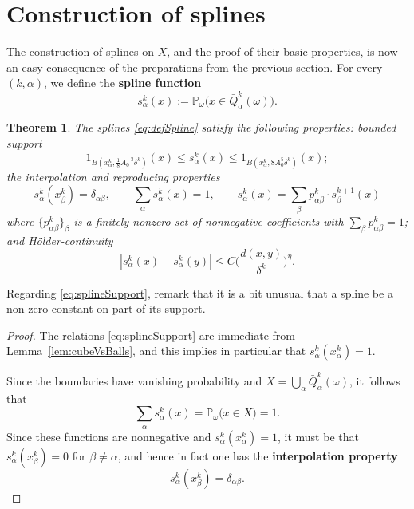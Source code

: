 \documentclass{amsart}
\numberwithin{equation}{section}
\theoremstyle{plain}
\newtheorem{theorem}[equation]{Theorem}
\theoremstyle{definition}
\theoremstyle{remark}
\begin{document}
{{\section{Construction of splines}

The construction of splines on $X$, and the proof of their basic properties, is now an easy consequence of the preparations from the previous section.
For every $(k,\alpha)$, we define the \textbf{spline function}
\begin{equation}\label{eq:defSpline}
  s^k_{\alpha}(x):={\mathbb{P}}_{\omega}\Big(x\in\bar{Q}^k_{\alpha}(\omega)\Big).
\end{equation}

\begin{theorem}
The splines \eqref{eq:defSpline} satisfy the following properties: bounded support
\begin{equation}\label{eq:splineSupport}
  1_{B(x^k_{\alpha},\tfrac{1}{8}A_0^{-3}\delta^k)}(x)\leq s^k_{\alpha}(x)\leq 1_{B(x^k_{\alpha},8A_0^5\delta^k)}(x);
\end{equation}
the interpolation and reproducing properties
\begin{equation}\label{eq:splineSum}
  s^k_\alpha(x^k_\beta)=\delta_{\alpha\beta},\qquad
  \sum_{\alpha}s^k_{\alpha}(x)=1,\qquad
  s^k_{\alpha}(x)
  =\sum_{\beta}p^k_{\alpha\beta}\cdot s^{k+1}_{\beta}(x)
\end{equation}
where $\{p^k_{\alpha\beta}\}_\beta$ is a finitely nonzero set of nonnegative coefficients with $\sum_\beta p^k_{\alpha\beta}=1$;
and H\"older-continuity
\begin{equation*}
  {|{s^k_{\alpha}(x)-s^k_{\alpha}(y)}|}
    \leq C\Big(\frac{d(x,y)}{\delta^k}\Big)^{\eta}.
\end{equation*}
\end{theorem}

Regarding \eqref{eq:splineSupport}, remark that it is a bit unusual that a spline be a non-zero constant  on part of its support.

\begin{proof}
The relations \eqref{eq:splineSupport} are immediate from Lemma~\ref{lem:cubeVsBalls}, and this implies in particular that $s^k_{\alpha}(x^k_{\alpha})=1$.

Since the boundaries have vanishing probability and $X=\bigcup_{\alpha}\bar{Q}^k_{\alpha}(\omega)$, it follows that
\begin{equation}\label{sum}
  \sum_{\alpha}s^k_{\alpha}(x)={\mathbb{P}}_{\omega}\Big(x\in X\Big)=1.
\end{equation}
Since these functions are nonnegative and $s^k_{\alpha}(x^k_{\alpha})=1$, it must be that $s^k_{\alpha}(x^k_{\beta})=0$ for $\beta\neq\alpha$, and hence in fact one has the \textbf{interpolation property}
\begin{equation}\label{interpolation}
  s^k_{\alpha}(x^k_{\beta})=\delta_{\alpha\beta}.
\end{equation}


\end{proof}}}
\end{document}
